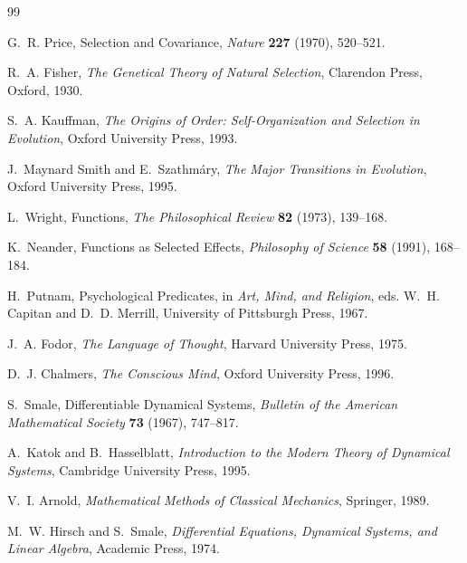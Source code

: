 \documentclass[12pt, a4paper, oneside]{article}
\theoremstyle{plain}
\theoremstyle{definition}
\theoremstyle{remark}
\begin{document}
\newpage

\begin{thebibliography}{99}

G.~R. Price,
\newblock Selection and Covariance,
\newblock \emph{Nature} \textbf{227} (1970), 520--521.

R.~A. Fisher,
\newblock \emph{The Genetical Theory of Natural Selection},
\newblock Clarendon Press, Oxford, 1930.

S.~A. Kauffman,
\newblock \emph{The Origins of Order: Self-Organization and Selection in Evolution},
\newblock Oxford University Press, 1993.

J.~Maynard Smith and E.~Szathmáry,
\newblock \emph{The Major Transitions in Evolution},
\newblock Oxford University Press, 1995.

L.~Wright,
\newblock Functions,
\newblock \emph{The Philosophical Review} \textbf{82} (1973), 139--168.

K.~Neander,
\newblock Functions as Selected Effects,
\newblock \emph{Philosophy of Science} \textbf{58} (1991), 168--184.

H.~Putnam,
\newblock Psychological Predicates,
\newblock in \emph{Art, Mind, and Religion}, eds. W.~H. Capitan and D.~D. Merrill, University of Pittsburgh Press, 1967.

J.~A. Fodor,
\newblock \emph{The Language of Thought},
\newblock Harvard University Press, 1975.

D.~J. Chalmers,
\newblock \emph{The Conscious Mind},
\newblock Oxford University Press, 1996.

S.~Smale,
\newblock Differentiable Dynamical Systems,
\newblock \emph{Bulletin of the American Mathematical Society} \textbf{73} (1967), 747--817.

A.~Katok and B.~Hasselblatt,
\newblock \emph{Introduction to the Modern Theory of Dynamical Systems},
\newblock Cambridge University Press, 1995.

V.~I. Arnold,
\newblock \emph{Mathematical Methods of Classical Mechanics},
\newblock Springer, 1989.

M.~W. Hirsch and S.~Smale,
\newblock \emph{Differential Equations, Dynamical Systems, and Linear Algebra},
\newblock Academic Press, 1974.


\end{thebibliography}
\end{document}
